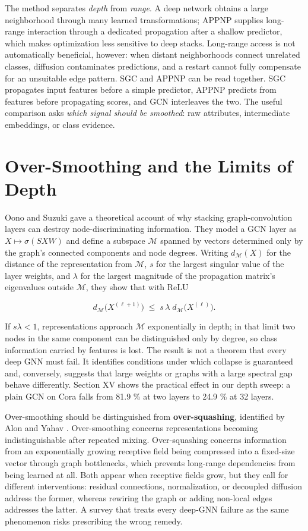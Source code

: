 \documentclass[conference]{IEEEtran}
\begin{document}
The method separates \emph{depth} from \emph{range}. A deep network obtains a large neighborhood through many learned transformations; APPNP supplies long-range interaction through a dedicated propagation after a shallow predictor, which makes optimization less sensitive to deep stacks. Long-range access is not automatically beneficial, however: when distant neighborhoods connect unrelated classes, diffusion contaminates predictions, and a restart cannot fully compensate for an unsuitable edge pattern. SGC and APPNP can be read together. SGC propagates input features before a simple predictor, APPNP predicts from features before propagating scores, and GCN interleaves the two. The useful comparison asks \emph{which signal should be smoothed}: raw attributes, intermediate embeddings, or class evidence.

\section{Over-Smoothing and the Limits of Depth}

Oono and Suzuki \cite{b7} gave a theoretical account of why stacking graph-convolution layers can destroy node-discriminating information. They model a GCN layer as \(X\mapsto\sigma(SXW)\) and define a subspace \(\mathcal{M}\) spanned by vectors determined only by the graph's connected components and node degrees. Writing \(d_{\mathcal{M}}(X)\) for the distance of the representation from \(\mathcal{M}\), \(s\) for the largest singular value of the layer weights, and \(\lambda\) for the largest magnitude of the propagation matrix's eigenvalues outside \(\mathcal{M}\), they show that with ReLU

\[d_{\mathcal{M}}\big(X^{(\ell+1)}\big) \;\le\; s\,\lambda\; d_{\mathcal{M}}\big(X^{(\ell)}\big). \tag{13}\]

If \(s\lambda<1\), representations approach \(\mathcal{M}\) exponentially in depth; in that limit two nodes in the same component can be distinguished only by degree, so class information carried by features is lost. The result is not a theorem that every deep GNN must fail. It identifies conditions under which collapse is guaranteed and, conversely, suggests that large weights or graphs with a large spectral gap behave differently. Section XV shows the practical effect in our depth sweep: a plain GCN on Cora falls from 81.9 \% at two layers to 24.9 \% at 32 layers.

Over-smoothing should be distinguished from \textbf{over-squashing}, identified by Alon and Yahav \cite{b15}. Over-smoothing concerns representations becoming indistinguishable after repeated mixing. Over-squashing concerns information from an exponentially growing receptive field being compressed into a fixed-size vector through graph bottlenecks, which prevents long-range dependencies from being learned at all. Both appear when receptive fields grow, but they call for different interventions: residual connections, normalization, or decoupled diffusion address the former, whereas rewiring the graph or adding non-local edges addresses the latter. A survey that treats every deep-GNN failure as the same phenomenon risks prescribing the wrong remedy.
\end{document}
